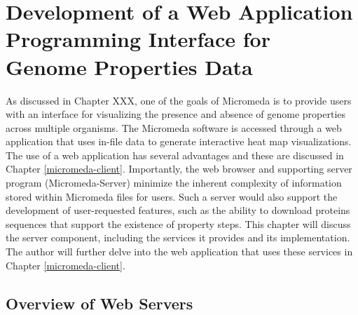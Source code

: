 \chapter{Development of a Web Application Programming Interface for Genome Properties Data} \label{micromeda-server}

As discussed in Chapter XXX, one of the goals of Micromeda is to provide users with an interface for visualizing the presence and absence of genome properties across multiple organisms. The Micromeda software is accessed through a web application that uses in-file data to generate interactive heat map visualizations. The use of a web application has several advantages and these are discussed in Chapter \ref{micromeda-client}. Importantly, the web browser and supporting server program (Micromeda-Server) minimize the inherent complexity of information stored within Micromeda files for users. Such a server would also support the development of user-requested features, such as the ability to download proteins sequences that support the existence of property steps. This chapter will discuss the server component, including the services it provides and its implementation. The author will further delve into the web application that uses these services in Chapter \ref{micromeda-client}.

\section{Overview of Web Servers}

